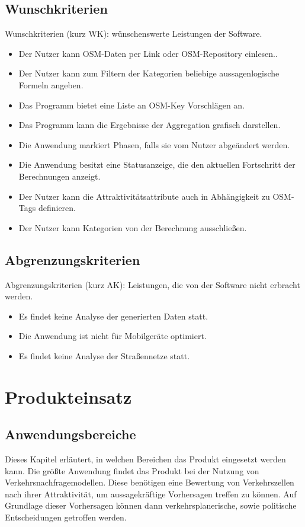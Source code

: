 \documentclass[parskip=full]{scrartcl} %
\begin{document}
\subsection{Wunschkriterien}
Wunschkriterien (kurz WK): wünschenswerte Leistungen der Software.
\begin{itemize}
    \item <WK1> Der Nutzer kann OSM-Daten per Link oder OSM-Repository einlesen..
    \item <WK2> Der Nutzer kann zum Filtern der Kategorien beliebige aussagenlogische Formeln angeben.
    \item <WK3> Das Programm bietet eine Liste an OSM-Key Vorschlägen an.
    \item <WK4> Das Programm kann die Ergebnisse der Aggregation grafisch darstellen.
    \item <WK5> Die Anwendung markiert Phasen, falls sie vom Nutzer abgeändert werden.
    \item <WK6> Die Anwendung besitzt eine Statusanzeige, die den aktuellen Fortschritt der Berechnungen anzeigt.
    \item <WK7> Der Nutzer kann die Attraktivitätsattribute auch in Abhängigkeit zu OSM-Tags definieren.
    \item <WK8> Der Nutzer kann Kategorien von der Berechnung ausschließen.
    
\end{itemize}

\subsection{Abgrenzungskriterien}
Abgrenzungskriterien (kurz AK): Leistungen, die von der Software nicht erbracht werden.
\begin{itemize}
    \item <AK1> Es findet keine Analyse der generierten Daten statt.
    \item <AK2> Die Anwendung ist nicht für Mobilgeräte optimiert.
    \item <AK3> Es findet keine Analyse der Straßennetze statt.
\end{itemize}
\newpage

\section{Produkteinsatz}

\subsection{Anwendungsbereiche}
Dieses Kapitel erläutert, in welchen Bereichen das Produkt eingesetzt werden kann. Die größte Anwendung findet das Produkt bei der Nutzung von Verkehrsnachfragemodellen. Diese benötigen eine Bewertung von Verkehrszellen nach ihrer Attraktivität, um aussagekräftige Vorhersagen treffen zu können. Auf Grundlage dieser Vorhersagen können dann verkehrsplanerische, sowie politische Entscheidungen getroffen werden.
\end{document}
